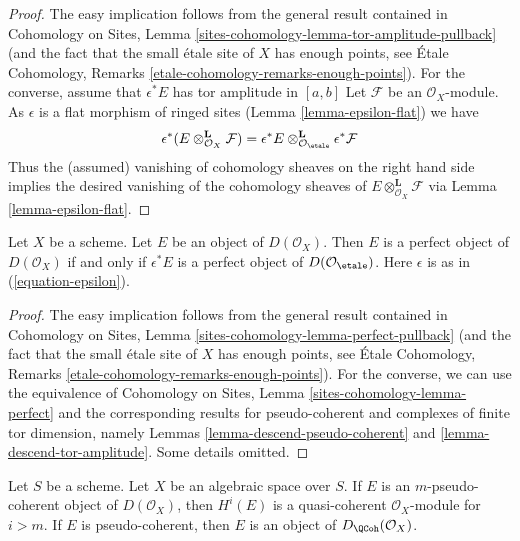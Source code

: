 \begin{proof}
The easy implication follows from the general result contained in
Cohomology on Sites, Lemma \ref{sites-cohomology-lemma-tor-amplitude-pullback}
(and the fact that the small \'etale site of $X$ has enough points, see
\'Etale Cohomology, Remarks \ref{etale-cohomology-remarks-enough-points}).
For the converse, assume that $\epsilon^*E$ has tor amplitude in $[a, b]$
Let $\mathcal{F}$ be an $\mathcal{O}_X$-module. As $\epsilon$ is a flat
morphism of ringed sites (Lemma \ref{lemma-epsilon-flat})
we have
$$
\epsilon^*(E \otimes^\mathbf{L}_{\mathcal{O}_X} \mathcal{F})
=
\epsilon^*E
\otimes^\mathbf{L}_{\mathcal{O}_\etale}
\epsilon^*\mathcal{F}
$$
Thus the (assumed) vanishing of cohomology sheaves on the right hand side
implies the desired vanishing of the cohomology sheaves of
$E \otimes^\mathbf{L}_{\mathcal{O}_X} \mathcal{F}$ via
Lemma \ref{lemma-epsilon-flat}.
\end{proof}

\begin{lemma}
\label{lemma-descend-perfect}
Let $X$ be a scheme. Let $E$ be an object of $D(\mathcal{O}_X)$.
Then $E$ is a perfect object of $D(\mathcal{O}_X)$ if and only if
$\epsilon^*E$ is a perfect object of $D(\mathcal{O}_\etale)$.
Here $\epsilon$ is as in (\ref{equation-epsilon}).
\end{lemma}

\begin{proof}
The easy implication follows from the general result contained in
Cohomology on Sites, Lemma \ref{sites-cohomology-lemma-perfect-pullback}
(and the fact that the small \'etale site of $X$ has enough points, see
\'Etale Cohomology, Remarks \ref{etale-cohomology-remarks-enough-points}).
For the converse, we can use the equivalence of
Cohomology on Sites, Lemma \ref{sites-cohomology-lemma-perfect}
and the corresponding results for pseudo-coherent and complexes of
finite tor dimension, namely
Lemmas \ref{lemma-descend-pseudo-coherent} and
\ref{lemma-descend-tor-amplitude}.
Some details omitted.
\end{proof}

\begin{lemma}
\label{lemma-pseudo-coherent}
Let $S$ be a scheme. Let $X$ be an algebraic space over $S$.
If $E$ is an $m$-pseudo-coherent object of $D(\mathcal{O}_X)$,
then $H^i(E)$ is a quasi-coherent $\mathcal{O}_X$-module for $i > m$.
If $E$ is pseudo-coherent, then $E$ is an object of
$D_\QCoh(\mathcal{O}_X)$.
\end{lemma}

